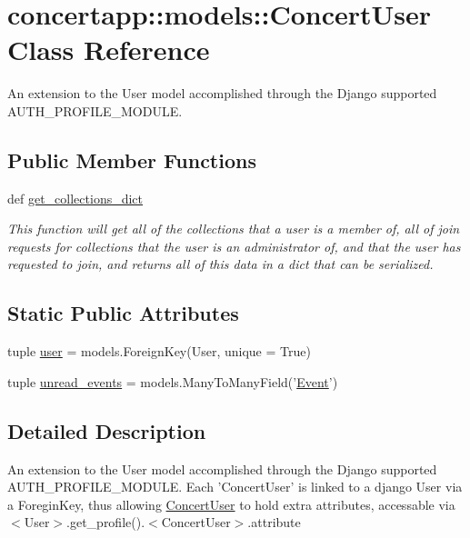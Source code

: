\hypertarget{classconcertapp_1_1models_1_1_concert_user}{
\section{concertapp::models::ConcertUser Class Reference}
\label{classconcertapp_1_1models_1_1_concert_user}
}


An extension to the User model accomplished through the Django supported AUTH\_\-PROFILE\_\-MODULE.  


\subsection*{Public Member Functions}
\begin{DoxyCompactItemize}
\item 
def \hyperlink{classconcertapp_1_1models_1_1_concert_user_a66409ebf3748ae90b9dd25ce9b50a2bc}{get\_\-collections\_\-dict}
\begin{DoxyCompactList}\small\item\em This function will get all of the collections that a user is a member of, all of join requests for collections that the user is an administrator of, and that the user has requested to join, and returns all of this data in a dict that can be serialized. \item\end{DoxyCompactList}\end{DoxyCompactItemize}
\subsection*{Static Public Attributes}
\begin{DoxyCompactItemize}
\item 
tuple \hyperlink{classconcertapp_1_1models_1_1_concert_user_aa65285f7d709e88fa6a162d9bbf65ee5}{user} = models.ForeignKey(User, unique = True)
\item 
tuple \hyperlink{classconcertapp_1_1models_1_1_concert_user_aeeb833d02871195146e30f63026f5f56}{unread\_\-events} = models.ManyToManyField('\hyperlink{classconcertapp_1_1models_1_1_event}{Event}')
\end{DoxyCompactItemize}


\subsection{Detailed Description}
An extension to the User model accomplished through the Django supported AUTH\_\-PROFILE\_\-MODULE. Each 'ConcertUser' is linked to a django User via a ForeginKey, thus allowing \hyperlink{classconcertapp_1_1models_1_1_concert_user}{ConcertUser} to hold extra attributes, accessable via $<$User$>$.get\_\-profile().$<$ConcertUser$>$.attribute 

